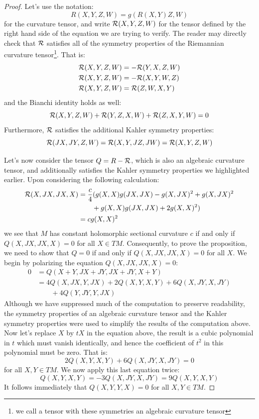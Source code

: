 \begin{proof}
%
Let's use the notation:
%
$$ R(X,Y,Z,W) = g( R(X,Y)Z, W ) $$
%
for the curvature tensor, and write $\mathcal{R} (X,Y,Z,W)$ for the tensor defined by the right hand side of the equation we are trying to verify.  The reader may directly check that $\mathcal{R}$ satisfies all of the symmetry properties of the Riemannian curvature tensor\footnote{we call a tensor with these symmetries an algebraic curvature tensor}.  That is:
%
\begin{align*}
\mathcal{R} (X,Y,Z,W) &= - \mathcal{R} (Y,X,Z,W) \\
\mathcal{R} (X,Y,Z,W) &= - \mathcal{R} (X,Y,W,Z) \\
\mathcal{R} (X,Y,Z,W) &= \mathcal{R}(Z,W,X,Y)
\end{align*}
%
and the Bianchi identity holds as well:
$$ \mathcal{R} (X,Y,Z,W) + \mathcal{R} (Y,Z,X,W) + \mathcal{R} (Z,X,Y,W) = 0 $$
%
Furthermore, $\mathcal{R}$ satisfies the additional Kahler symmetry properties:
%
$$ \mathcal{R}( JX, JY, Z, W ) = \mathcal{R} ( X, Y, JZ, JW ) = \mathcal{R} ( X,Y,Z,W ) $$

Let's now consider the tensor $Q = R - \mathcal{R}$, which is also an algebraic curvature tensor, and additionally satisfies the Kahler symmetry properties we highlighted earlier.  Upon considering the following calculation:
%
\begin{align*}
\mathcal{R} (X, JX, JX, X) &= \frac{c}{4} ( g(X,X)g(JX,JX) - g(X,JX)^2 + g(X, JX)^2 \\
& \qquad + g(X,X)g(JX,JX) + 2 g(X,X)^2 ) \\
&= c g(X,X)^2
\end{align*}
%
we see that $M$ has constant holomorphic sectional curvature $c$ if and only if $Q(X,JX,JX,X) = 0$ for all $X \in TM$.  Consequently, to prove the proposition, we need to show that $Q=0$ if and only if $Q(X,JX,JX,X) = 0$ for all $X$.
%
We begin by polarizing the equation $Q(X,JX,JX,X) = 0$:
%
\begin{align*}
0 &= Q ( X + Y, JX + JY, JX + JY, X + Y ) \\
&= 4 Q (X, JX, Y, JX ) +  2 Q (X,Y,X,Y) + 6 Q (X, JY, X, JY) \\
& \qquad + 4 Q ( Y, JY, Y, JX )
\end{align*}
%
Although we have suppressed much of the computation to preserve readability, the symmetry properties of an algebraic curvature tensor and the Kahler symmetry properties were used to simplify the results of the computation above.  Now let's replace $X$ by $tX$ in the equation above, the result is a cubic polynomial in $t$ which must vanish identically, and hence the coefficient of $t^2$ in this polynomial must be zero.  That is:
%
$$2 Q(X,Y,X,Y) + 6 Q(X, JY, X, JY) = 0 $$
%
for all $X,Y \in TM$.  We now apply this last equation twice:
%
$$ Q(X,Y,X,Y) = - 3 Q(X,JY,X,JY) = 9 Q(X, Y, X, Y) $$
%
It follows immediately that $Q(X,Y,Y,X) = 0$ for all $X,Y \in TM$.  


\end{proof}
